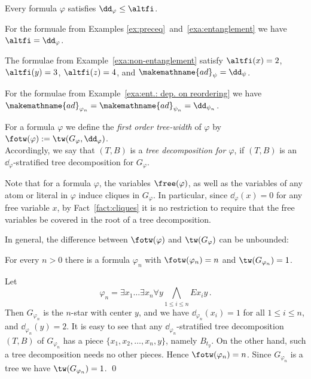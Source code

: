 \documentclass{LMCS}
\newcommand{\gfi}{G_{\varphi}}
\renewcommand{\phi}{\varphi}
\newcommand{\ad}{\dd_{\varphi}}
\newcommand{\alte}{\makemathname{ad}}
\begin{document}
\begin{rem}\label{rem:ead-ad-sigmat}
	Every formula $\phi$ satisfies $\ad\leq\altfi$. 
\end{rem}

\begin{exa}
For the formuale from Examples \ref{ex:preceq}~and~\ref{exa:entanglement} 
we have $\altfi=\ad$. 

The formulae from Example~\ref{exa:non-entanglement} 
satisfy $\altfi(x)=2$, $\altfi(y)=3$, $\altfi(z)=4$, 
and $\alte_{\psi}=\dd_{\psi}$. 

For the formulae from Example~\ref{exa:ent.: dep. on reordering} 
we have $\alte_{\phi_n}=\alte_{\psi_n}=\dd_{\psi_n}$. 
\end{exa}


\begin{defi}\label{defi:fotw} 
	For a formula $\phi$ we define the \emph{first order tree-width}
	of $\phi$ by $\fotw(\phi):=\tw(\gfi,\ad)$.\\ 
Accordingly, we say that $(T,B)$ is a \emph{tree decomposition for $\phi$}, 
if $(T,B)$ is an $\ad$-stratified tree decomposition for $\gfi$. 
\end{defi}

Note that for a formula $\phi$, the
variables $\free(\phi)$, as well as the variables of any atom or literal in
$\phi$ induce cliques in $\gfi$. 
In particular, since $\ad(x)=0$ for any free
variable $x$, by Fact~\ref{fact:cliques}
it is no restriction to require that the free variables be
covered in the root of a tree decomposition. 

In general, the difference between $\fotw(\phi)$ and $\tw(\gfi)$ can be
unbounded: 

\begin{prop}\label{prop:unbounded}
For every $n>0$ there is a
formula $\phi_n$ with $\fotw(\phi_n)=n$ and $\tw(G_{\phi_n})=1$. 
\end{prop}

\proof 
Let
\[
  \phi_n = \exists x_1 \ldots \exists x_n \forall y
    \bigwedge\limits_{1\leq i\leq n}Ex_iy \,.
\]
Then $G_{\phi_n}$ is the $n$-star with center $y$, 
and we have $\dd_{\phi_n}(x_i)=1$ for all $1\leq i\leq n$, 
and $\dd_{\phi_n}(y)=2$. 
It is easy to see 
that any $\dd_{\phi_n}$-stratified tree decomposition $(T,B)$ of $G_{\phi_n}$ 
has a piece $\{x_1,x_2,\ldots,x_n,y\}$, namely $B_{t_y}$. 
On the other hand, such a tree decomposition needs no other pieces. 
Hence $\fotw(\phi_n)=n$. 
Since $G_{\phi_n}$ is a tree we have $\tw(G_{\phi_n})=1$.
\qed
\end{document}
